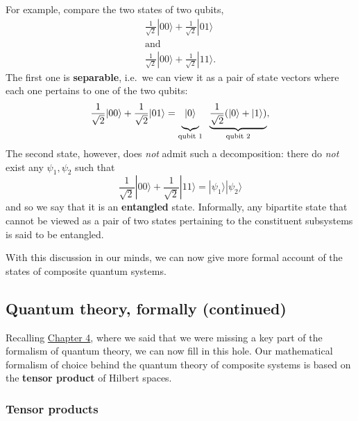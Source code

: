 \documentclass[fleqn]{article}
\begin{document}
For example, compare the two states of two qubits,
\[
  \begin{gathered}
    \frac{1}{\sqrt 2}|00\rangle + \frac{1}{\sqrt 2}|01\rangle
  \\\text{and}
  \\\frac{1}{\sqrt 2}|00\rangle + \frac{1}{\sqrt 2}|11\rangle.
  \end{gathered}
\]
The first one is \textbf{separable}, i.e.~we can view it as a pair of state vectors where each one pertains to one of the two qubits:
\[
  \frac{1}{\sqrt 2}|00\rangle + \frac{1}{\sqrt 2}|01\rangle
  = \underbrace{\vphantom{\frac{1}{\sqrt 2}}|0\rangle}_{\text{qubit 1}}
  \;\;
  \underbrace{\frac{1}{\sqrt 2}(|0\rangle+|1\rangle)}_{\text{qubit 2}},
\]
The second state, however, does \emph{not} admit such a decomposition: there do \emph{not} exist any \(\psi_1,\psi_2\) such that
\[
  \frac{1}{\sqrt 2}|00\rangle + \frac{1}{\sqrt 2}|11\rangle
  =
  |\psi_1\rangle|\psi_2\rangle
\]
and so we say that it is an \textbf{entangled} state.
Informally, any bipartite state that cannot be viewed as a pair of two states pertaining to the constituent subsystems is said to be entangled.

With this discussion in our minds, we can now give more formal account of the states of composite quantum systems.

\hypertarget{quantum-theory-formally-continued}{%
\subsection{Quantum theory, formally (continued)}\label{quantum-theory-formally-continued}}

Recalling \protect\hyperlink{measurements}{Chapter 4}, where we said that we were missing a key part of the formalism of quantum theory, we can now fill in this hole.
Our mathematical formalism of choice behind the quantum theory of composite systems is based on the \textbf{tensor product} of Hilbert spaces.

\hypertarget{tensor-products}{%
\subsubsection{Tensor products}\label{tensor-products}}
\end{document}
